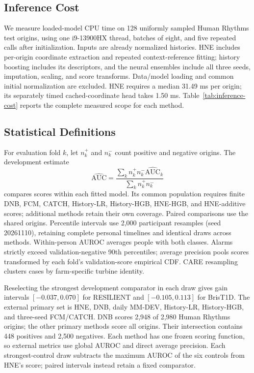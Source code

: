 \subsection{Inference Cost}
We measure loaded-model CPU time on 128 uniformly sampled Human Rhythms test origins, using one i9-13900HX thread, batches of eight, and five repeated calls after initialization. Inputs are already normalized histories. HNE includes per-origin coordinate extraction and repeated context-reference fitting; history boosting includes its descriptors, and the neural ensembles include all three seeds, imputation, scaling, and score transforms. Data/model loading and common initial normalization are excluded. HNE requires a median 31.49 ms per origin; its separately timed cached-coordinate head takes 1.50 ms. Table~\ref{tab:inference-cost} reports the complete measured scope for each method.

\begin{table}[!htb]
\centering
\caption{CPU inference time and saved predictor size. IQR is the spread over five timed calls. Cached-head timing excludes coordinate construction.}
\label{tab:inference-cost}
\end{table}

\subsection{Statistical Definitions}
For evaluation fold $k$, let $n_k^+$ and $n_k^-$ count positive and negative origins. The development estimate
\begin{equation}
 \widehat{\mathrm{AUC}}=
 \frac{\sum_k n_k^+n_k^-\widehat{\mathrm{AUC}}_k}
 {\sum_k n_k^+n_k^-}
\end{equation}
compares scores within each fitted model. Its common population requires finite DNB, FCM, CATCH, History-LR, History-HGB, HNE-HGB, and HNE-additive scores; additional methods retain their own coverage. Paired comparisons use the shared origins. Percentile intervals use 2,000 participant resamples (seed 20261110), retaining complete personal timelines and identical draws across methods. Within-person AUROC averages people with both classes. Alarms strictly exceed validation-negative 90th percentiles; average precision pools scores transformed by each fold's validation-score empirical CDF. CARE resampling clusters cases by farm-specific turbine identity.

Reselecting the strongest development comparator in each draw gives gain intervals $[-0.037,0.070]$ for RESILIENT and $[-0.105,0.113]$ for BrisT1D. The external primary set is HNE, DNB, daily MM-DEV, History-LR, History-HGB, and three-seed FCM/CATCH. DNB scores 2,948 of 2,980 Human Rhythms origins; the other primary methods score all origins. Their intersection contains 448 positives and 2,500 negatives. Each method has one frozen scoring function, so external metrics use global AUROC and direct average precision. Each strongest-control draw subtracts the maximum AUROC of the six controls from HNE's score; paired intervals instead retain a fixed comparator.

